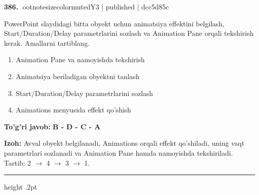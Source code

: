 \documentclass[10pt,a4paper]{article}
\begin{document}
\textbf{\color{ink}386.} {ootnotesizecolor{muted}Y3 | published | dcc5d85c}
\par
PowerPoint slaydidagi bitta obyekt uchun animatsiya effektini belgilash, Start/Duration/Delay parametrlarini sozlash va Animation Pane orqali tekshirish kerak. Amallarni tartiblang.
\begin{enumerate}[label=\Alph*),leftmargin=9mm]
\item Animation Pane va namoyishda tekshirish
\item Animatsiya beriladigan obyektni tanlash
\item Start/Duration/Delay parametrlarini sozlash
\item Animations menyusida effekt qo'shish
\end{enumerate}
\begin{tcolorbox}[enhanced,breakable,colback=teal!4,colframe=teal!55!black,boxrule=0.45pt,arc=1.2mm,left=2.8mm,right=2.8mm,top=2mm,bottom=2mm]
\textbf{\color{teal}To'g'ri javob:} \textbf{B - D - C - A}
\par\smallskip
\textbf{Izoh:} Avval obyekt belgilanadi, Animations orqali effekt qo'shiladi, uning vaqt parametrlari sozlanadi va Animation Pane hamda namoyishda tekshiriladi. Tartib: 2 \ensuremath{\rightarrow} 4 \ensuremath{\rightarrow} 3 \ensuremath{\rightarrow} 1.
\end{tcolorbox}
\vspace{2mm}\hrule height .2pt\vspace{2mm}
\end{document}
